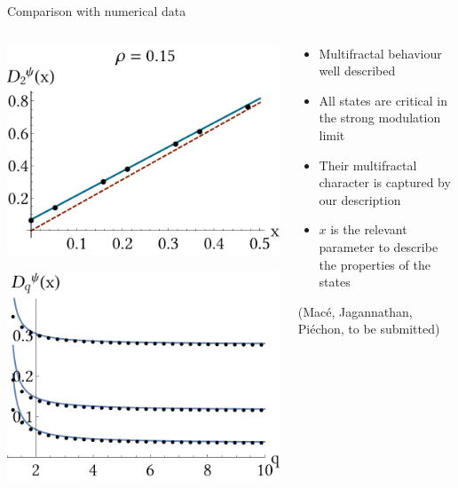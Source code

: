 \documentclass[xcolor=x11names,compress,professionalfonts]{beamer}
\renewcommand{\(}{\begin{columns}}
\renewcommand{\)}{\end{columns}}
\newcommand{\<}[1]{\begin{column}{#1}}
\renewcommand{\>}{\end{column}}
\begin{document}
\begin{frame}{Comparison with numerical data}
\begin{columns}
	\begin{column}{5cm}
		\centering
  		\includegraphics[scale=.4]{local_wf.pdf}
  		
  		\includegraphics[scale=.4]{local_wf_q.pdf}
	\end{column}
	\begin{column}{5cm}
		\begin{itemize}
			\item Multifractal behaviour well described
			\item All states are critical in the strong modulation limit
			\item Their multifractal character is captured by our description
			\item $x$ is the relevant parameter to describe the properties of the states
		\end{itemize}
		\begin{flushright}
		(Macé, Jagannathan, Piéchon, to be submitted)
		\end{flushright}
	\end{column}
\end{columns}
\end{frame}
\end{document}

